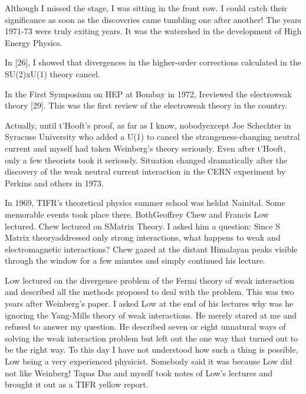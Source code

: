 Although I missed the stage, I was sitting in the front row. I could 
catch their significance as soon as the discoveries came tumbling one 
after another! The years 1971-73 were truly exiting years. It was the 
watershed in the development of High Energy Physics.

In [26], I showed that divergences in the higher-order corrections 
calculated in the SU(2)xU(1) theory cancel.

In the First Symposium on HEP at Bombay in 1972, I\break reviewed the 
electroweak theory [29]. This was the first review of the electroweak 
theory in the country.
 
Actually, until t'Hooft's proof, as far as I know, nobody\break except Joe 
Schechter in Syracuse University who added a U(1) to cancel the 
strangeness-changing neutral current and myself had taken Weinberg's 
theory seriously. Even after t'Hooft, only a few theorists took it 
seriously. Situation changed dramatically after the discovery of the 
weak neutral current interaction in the CERN experiment by Perkins and 
others in 1973.

In 1969, TIFR's theoretical physics summer school was held\break at Nainital. 
Some memorable events took place there. Both\break Geoffrey Chew and Francis 
Low lectured. Chew lectured on S\break Matrix Theory. I asked him a question: 
Since S Matrix theory\break addressed only strong interactions, what happens 
to weak and electromagnetic interactions? Chew gazed at the distant 
Himala\-yan peaks visible through the window for a few minutes and simply 
continued his lecture.

Low lectured on the divergence problem of the Fermi theory of weak 
interaction and described all the methods proposed to deal with the 
problem. This was two years after Weinberg's paper. I asked Low at the 
end of his lectures why was he ignoring the Yang-Mills theory of weak 
interactions. He merely stared at me and refused to answer my question. 
He described seven or eight unnatural ways of solving the weak 
interaction problem but left out the one way that turned out to be the 
right way. To this day I have not understood how such a thing is 
possible, Low being a very experienced physicist. Somebody said it was 
because Low did not like Weinberg! Tapas Das and myself took notes of 
Low's lectures and brought it out as a TIFR yellow report.

